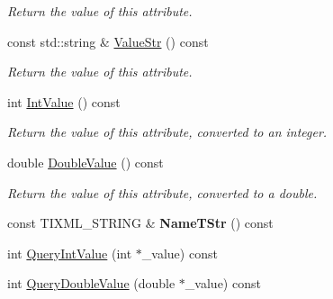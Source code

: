 \begin{DoxyCompactItemize}
\begin{DoxyCompactList}\small\item\em Return the value of this attribute. \end{DoxyCompactList}\item 
\hypertarget{class_ti_xml_attribute_a87705c3ccf9ee9417beb4f7cbacd4d33}{const std\+::string \& \hyperlink{class_ti_xml_attribute_a87705c3ccf9ee9417beb4f7cbacd4d33}{Value\+Str} () const }\label{class_ti_xml_attribute_a87705c3ccf9ee9417beb4f7cbacd4d33}

\begin{DoxyCompactList}\small\item\em Return the value of this attribute. \end{DoxyCompactList}\item 
\hypertarget{class_ti_xml_attribute_aa1a20ad59dc7e89a0ab265396360d50f}{int \hyperlink{class_ti_xml_attribute_aa1a20ad59dc7e89a0ab265396360d50f}{Int\+Value} () const }\label{class_ti_xml_attribute_aa1a20ad59dc7e89a0ab265396360d50f}

\begin{DoxyCompactList}\small\item\em Return the value of this attribute, converted to an integer. \end{DoxyCompactList}\item 
\hypertarget{class_ti_xml_attribute_a2880ddef53fc7522c99535273954d230}{double \hyperlink{class_ti_xml_attribute_a2880ddef53fc7522c99535273954d230}{Double\+Value} () const }\label{class_ti_xml_attribute_a2880ddef53fc7522c99535273954d230}

\begin{DoxyCompactList}\small\item\em Return the value of this attribute, converted to a double. \end{DoxyCompactList}\item 
\hypertarget{class_ti_xml_attribute_a64cee17bceb8232eb0736d26dd082d79}{const T\+I\+X\+M\+L\+\_\+\+S\+T\+R\+I\+N\+G \& {\bfseries Name\+T\+Str} () const }\label{class_ti_xml_attribute_a64cee17bceb8232eb0736d26dd082d79}

\item 
int \hyperlink{class_ti_xml_attribute_ad6c93088ee21af41a107931223339344}{Query\+Int\+Value} (int $\ast$\+\_\+value) const 
\item 
\hypertarget{class_ti_xml_attribute_ac87b2a8489906a5d7aa2875f20be3513}{int \hyperlink{class_ti_xml_attribute_ac87b2a8489906a5d7aa2875f20be3513}{Query\+Double\+Value} (double $\ast$\+\_\+value) const }\label{class_ti_xml_attribute_ac87b2a8489906a5d7aa2875f20be3513}


\end{DoxyCompactItemize}
